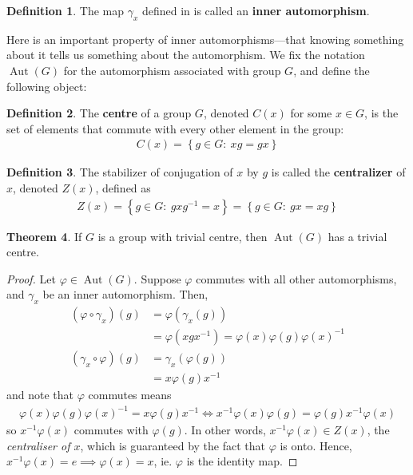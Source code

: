 \documentclass[11pt]{amsart} %
\theoremstyle{definition}
\newtheorem{definition}{Definition}[section]
\newtheorem{theorem}[definition]{Theorem}
\theoremstyle{definition}
\DeclareMathOperator{\aut}{Aut}
\numberwithin{equation}{section}
\newcommand{\condset}[4]{\left\{ #1  : \: #2 #3 #4 \right\}}
\begin{document}
\begin{definition}
	\label{definnerautomorphism}
	The map $\gamma_x$ defined in  is called an \textbf{inner automorphism}.
\end{definition}

Here is an important property of inner automorphisms---that knowing something about it tells us something about the automorphism. We fix the notation $\aut (G)$ for the automorphism associated with group $G$, and define the following object:

\begin{definition}
	\label{defcentre}
	The \textbf{centre} of a group $G$, denoted $C(x)$ for some $x \in G$, is the set of elements that commute with every other element in the group:
	\begin{align*}
		C(x) = \condset{g \in G}{xg}{=}{gx}
	\end{align*}
\end{definition}


\begin{definition}
	\label{defcentraliser}
	The stabilizer of conjugation of $x$ by $g$ is called the \textbf{centralizer} of $x$, denoted $Z(x)$, defined as
	\begin{align*}
		Z(x) = \condset{g \in G}{gxg^{-1}}{=}{x} = \condset{g \in G}{gx}{=}{xg}
	\end{align*}
\end{definition}

\begin{theorem}
	\label{thmtrivialcentreimpliesautomorphismhastrivialcentre}
	If $G$ is a group with trivial centre, then $\aut(G)$ has a trivial centre.
\end{theorem}


\begin{proof}
	Let $\varphi \in \aut(G)$. Suppose $\varphi$ commutes with all other automorphisms, and $\gamma_x$ be an inner automorphism. Then,
	\begin{align*}
		(\varphi \circ \gamma_x) (g) &= \varphi(\gamma_x(g)) \\
			&= \varphi(xgx^{-1}) = \varphi(x) \varphi(g) \varphi(x)^{-1} \\
		(\gamma_x \circ \varphi) (g) &= \gamma_x(\varphi(g)) \\
			&= x \varphi(g) x^{-1}
	\end{align*}
	and note that $\varphi$ commutes means
	\begin{align*}
		\varphi(x) \varphi(g) \varphi(x)^{-1} = x \varphi(g) x^{-1} \iff x^{-1} \varphi(x) \varphi(g) = \varphi(g) x^{-1} \varphi(x)
	\end{align*}
	so $x^{-1} \varphi(x) $ commutes with $\varphi(g)$. In other words, $x^{-1} \varphi(x) \in Z(x)$, the \textit{centraliser of $x$}, which is guaranteed by the fact that $\varphi$ is onto. Hence, $x^{-1} \varphi(x) = e \implies \varphi(x) = x$, ie. $\varphi$ is the identity map.
\end{proof}
\end{document}
